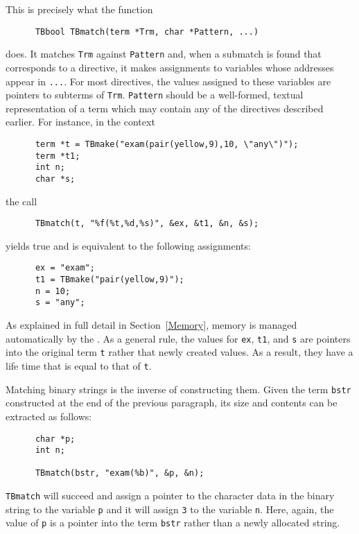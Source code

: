 \documentclass[a4,twoside,noweb]{article} %
\begin{document}
\noindent This is precisely what the function
\begin{verbatim}
      TBbool TBmatch(term *Trm, char *Pattern, ...)
\end{verbatim}
does. It matches {\tt Trm} against {\tt Pattern} and, when a submatch
is found that corresponds to a directive, it makes assignments to
variables whose addresses appear in {\tt ...}.
For most directives, the values assigned to these variables are pointers to
subterms of {\tt Trm}.
{\tt Pattern} should
be a well-formed, textual representation of a term which may contain
any of the directives described earlier.  For instance, in the context
\begin{verbatim}
      term *t = TBmake("exam(pair(yellow,9),10, \"any\")");
      term *t1;
      int n;
      char *s;
\end{verbatim}
the call 
\begin{verbatim}
      TBmatch(t, "%f(%t,%d,%s)", &ex, &t1, &n, &s);
\end{verbatim}
yields true and is equivalent to the following assignments:
\begin{verbatim}
      ex = "exam";
      t1 = TBmake("pair(yellow,9)");
      n = 10;
      s = "any";
\end{verbatim}
As explained in full detail in Section~\ref{Memory}, memory is managed
automatically by the \TB.  As a general rule, the values for {\tt ex},
{\tt t1}, and {\tt s} are pointers into the original term {\tt t}
rather that newly created values. As a result, they have a life time
that is equal to that of {\tt t}.

Matching binary strings is the inverse of constructing them. Given
the term {\tt bstr} constructed at the end of the previous paragraph,
its size and contents can be extracted as follows:
\begin{verbatim}
      char *p;
      int n;

      TBmatch(bstr, "exam(%b)", &p, &n);
\end{verbatim}
{\tt TBmatch} will succeed and assign a pointer to the character data
in the binary string to the variable 
{\tt p} and it will assign {\tt 3} to the variable {\tt n}.
Here, again, the value of {\tt p} is a pointer into the term {\tt bstr}
rather than a newly allocated string.
\end{document}
